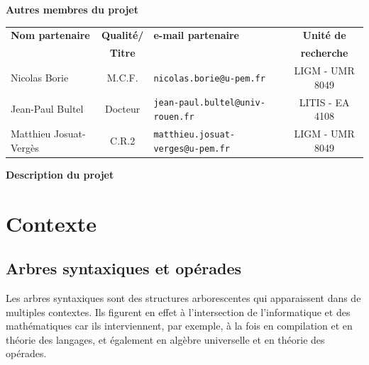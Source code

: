 \documentclass[10pt,reqno]{amsart}
\numberwithin{equation}{subsection}
\begin{document}
\Large{\bf{Autres membres du projet}}

\begin{center}
\begin{small}
\begin{tabular}{|l|c|l|c|}\hline
    \bf{Nom partenaire} & \bf{Qualité/} & \bf{e-mail partenaire}
        & \bf{Unité de} \\
    & \bf{Titre} &  & \bf{recherche} \\ \hline
    Nicolas Borie & M.C.F. & {\tt nicolas.borie@u-pem.fr}
        & LIGM - UMR 8049 \\ \hline
    Jean-Paul Bultel & Docteur & {\tt jean-paul.bultel@univ-rouen.fr}
        & LITIS - EA 4108 \\ \hline
  Matthieu Josuat-Vergès \qquad & C.R.2 & {\tt matthieu.josuat-verges@u-pem.fr}
   \qquad
    & LIGM - UMR 8049 \qquad \\ \hline
\end{tabular}
\end{small}
\end{center}
\bigskip

\Large{\bf{Description du projet}}

\section{Contexte}

\subsection{Arbres syntaxiques et opérades}
Les arbres syntaxiques sont des structures arborescentes qui apparaissent 
dans de multiples contextes. Ils figurent en effet à l'intersection de
l'informatique et des mathématiques car ils interviennent, par exemple,
à la fois en compilation et en théorie des langages, et également en 
algèbre universelle et en théorie des opérades.
\end{document}
